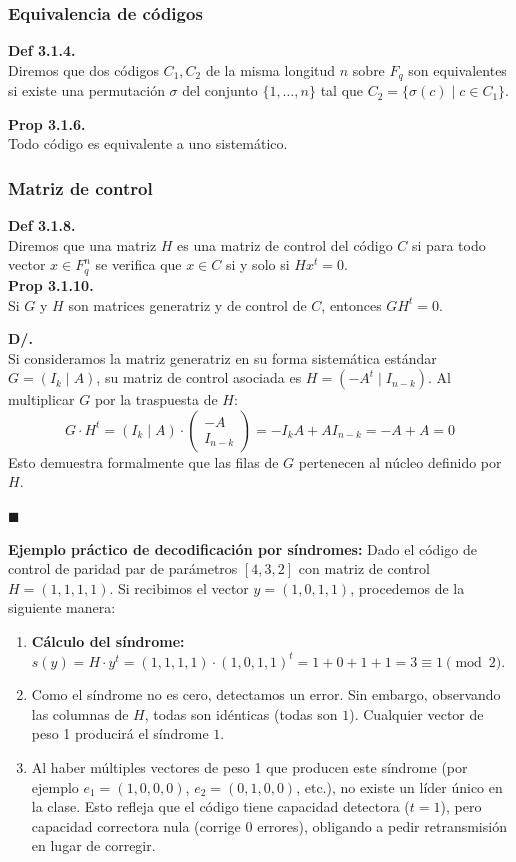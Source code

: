 \documentclass{article}
\begin{document}
\subsubsection{Equivalencia de códigos}
\textbf{Def 3.1.4.}\\
Diremos que dos códigos $C_{1}, C_{2}$ de la misma longitud $n$ sobre $F_{q}$ son equivalentes si existe una permutación $\sigma$ del conjunto $\{1, \dots, n\}$ tal que $C_{2}=\{\sigma(c) \mid c \in C_{1}\}$.

\textbf{Prop 3.1.6.}\\
Todo código es equivalente a uno sistemático.

\subsubsection{Matriz de control}
\textbf{Def 3.1.8.}\\
Diremos que una matriz $H$ es una matriz de control del código $C$ si para todo vector $x \in F_{q}^{n}$ se verifica que $x \in C$ si y solo si $Hx^{t}=0$.\\
\textbf{Prop 3.1.10.}\\
Si $G$ y $H$ son matrices generatriz y de control de $C$, entonces $GH^{t}=0$.

\noindent\textbf{D/. }\\
Si consideramos la matriz generatriz en su forma sistemática estándar $G = (I_k \mid A)$, su matriz de control asociada es $H = (-A^t \mid I_{n-k})$.
Al multiplicar $G$ por la traspuesta de $H$:
\[ G \cdot H^t = (I_k \mid A) \cdot \begin{pmatrix} -A \\ I_{n-k} \end{pmatrix} = -I_k A + A I_{n-k} = -A + A = 0 \]
Esto demuestra formalmente que las filas de $G$ pertenecen al núcleo definido por $H$.

 \noindent$\blacksquare$

\vspace{0.3cm}
\textbf{Ejemplo práctico de decodificación por síndromes:}
Dado el código de control de paridad par de parámetros $[4,3,2]$ con matriz de control $H = (1, 1, 1, 1)$. Si recibimos el vector $y = (1,0,1,1)$, procedemos de la siguiente manera:
\begin{enumerate}
    \item \textbf{Cálculo del síndrome:} $s(y) = H \cdot y^t = (1,1,1,1) \cdot (1,0,1,1)^t = 1+0+1+1 = 3 \equiv 1 \pmod 2$.
    \item Como el síndrome no es cero, detectamos un error. Sin embargo, observando las columnas de $H$, todas son idénticas (todas son $1$). Cualquier vector de peso 1 producirá el síndrome $1$. 
    \item Al haber múltiples vectores de peso 1 que producen este síndrome (por ejemplo $e_1=(1,0,0,0)$, $e_2=(0,1,0,0)$, etc.), no existe un líder único en la clase. Esto refleja que el código tiene capacidad detectora ($t=1$), pero capacidad correctora nula (corrige $0$ errores), obligando a pedir retransmisión en lugar de corregir.
\end{enumerate}
\end{document}
